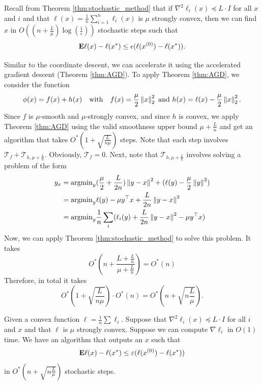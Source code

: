 Recall from Theorem \ref{thm:stochastic_method} that if $\nabla^{2}\ell_{i}(x)\preceq L\cdot I$
for all $x$ and $i$ and that $\ell(x)=\frac{1}{n}\sum^{n}_{i=1}\ell_{i}(x)$
is $\mu$ strongly convex, then we can find $x$ in $O((n+\frac{L}{\mu})\log(\frac{1}{\epsilon}))$
stochastic steps such that 
\[
\mathbf{E}\ell(x)-\ell(x^{*})\leq\epsilon(\ell(x^{(0)})-\ell(x^{*})).
\]

Similar to the coordinate descent, we can accelerate it using the
accelerated gradient descent (Theorem \ref{thm:AGD}). To apply Theorem
\ref{thm:AGD}, we consider the function 
\[
\phi(x)=f(x)+h(x)\quad\text{with}\quad f(x)=\frac{\mu}{2}\left\Vert x\right\Vert^{2}_{2}\text{ and }h(x)=\ell(x)-\frac{\mu}{2}\left\Vert x\right\Vert^{2}_{2}.
\]
Since $f$ is $\mu$-smooth and $\mu$-strongly convex, and since
$h$ is convex, we apply Theorem \ref{thm:AGD} using the valid smoothness
upper bound $\mu+\frac{L}{n}$ and get an algorithm that takes $O^{*}(1+\sqrt{\frac{L}{n\mu}})$
steps. Note that each step involves $\mathcal{T}_{f}+\mathcal{T}_{h,\mu+\frac{L}{n}}$.
Obviously, $\mathcal{T}_{f}=0$. Next, note that $\mathcal{T}_{h,\mu+\frac{L}{n}}$
involves solving a problem of the form
\begin{align*}
y_{x} & =\mathrm{argmin}_{y}(\frac{\mu}{2}+\frac{L}{2n})\left\Vert y-x\right\Vert^{2}+(\ell(y)-\frac{\mu}{2}\left\Vert y\right\Vert^{2})\\
 & =\mathrm{argmin}_{y}\ell(y)-\mu y^{\top}x+\frac{L}{2n}\left\Vert y-x\right\Vert^{2}\\
 & =\mathrm{argmin}_{y}\frac{1}{n}\sum_{i}(\ell_{i}(y)+\frac{L}{2n}\left\Vert y-x\right\Vert^{2}-\mu y^{\top}x)
\end{align*}
Now, we can apply Theorem \ref{thm:stochastic_method} to solve this
problem. It takes 
\[
O^{*}(n+\frac{L+\frac{L}{n}}{\mu+\frac{L}{n}})=O^{*}(n)
\]
Therefore, in total it takes
\[
O^{*}(1+\sqrt{\frac{L}{n\mu}})\cdot O^{*}(n)=O^{*}(n+\sqrt{n\frac{L}{\mu}}).
\]

\begin{thm}
\label{thm:acc_stochastic_method}Given a convex function $\ell=\frac{1}{n}\sum\ell_{i}$.
Suppose that $\nabla^{2}\ell_{i}(x)\preceq L\cdot I$ for all $i$
and $x$ and that $\ell$ is $\mu$ strongly convex. Suppose we can
compute $\nabla\ell_{i}$ in $O(1)$ time. We have an algorithm that
outputs an $x$ such that 
\[
\mathbf{E}\ell(x)-\ell(x^{*})\leq\varepsilon(\ell(x^{(0)})-\ell(x^{*}))
\]
in $O^{*}(n+\sqrt{n\frac{L}{\mu}})$ stochastic steps.
\end{thm}


